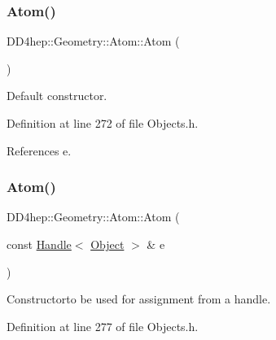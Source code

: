 \subsubsection{\texorpdfstring{Atom()}{Atom()}\hspace{0.1cm}{\footnotesize\ttfamily [1/4]}}
{\footnotesize\ttfamily D\+D4hep\+::\+Geometry\+::\+Atom\+::\+Atom (\begin{DoxyParamCaption}{ }\end{DoxyParamCaption})\hspace{0.3cm}{\ttfamily [inline]}}



Default constructor. 



Definition at line 272 of file Objects.\+h.



References e.

\hypertarget{class_d_d4hep_1_1_geometry_1_1_atom_a60bf5f87d457ce7d265149f6a13c4c0f}{}\label{class_d_d4hep_1_1_geometry_1_1_atom_a60bf5f87d457ce7d265149f6a13c4c0f} 
\subsubsection{\texorpdfstring{Atom()}{Atom()}\hspace{0.1cm}{\footnotesize\ttfamily [2/4]}}
{\footnotesize\ttfamily D\+D4hep\+::\+Geometry\+::\+Atom\+::\+Atom (\begin{DoxyParamCaption}\item[{const \hyperlink{class_d_d4hep_1_1_handle}{Handle}$<$ \hyperlink{class_d_d4hep_1_1_geometry_1_1_atom_a9fdd9fe52048018b3cba23bc9fb855fd}{Object} $>$ \&}]{e }\end{DoxyParamCaption})\hspace{0.3cm}{\ttfamily [inline]}}



Constructorto be used for assignment from a handle. 



Definition at line 277 of file Objects.\+h.

\hypertarget{class_d_d4hep_1_1_geometry_1_1_atom_aa4000a63b8005e2ea5db6f38bbf95064}{}\label{class_d_d4hep_1_1_geometry_1_1_atom_aa4000a63b8005e2ea5db6f38bbf95064} 

